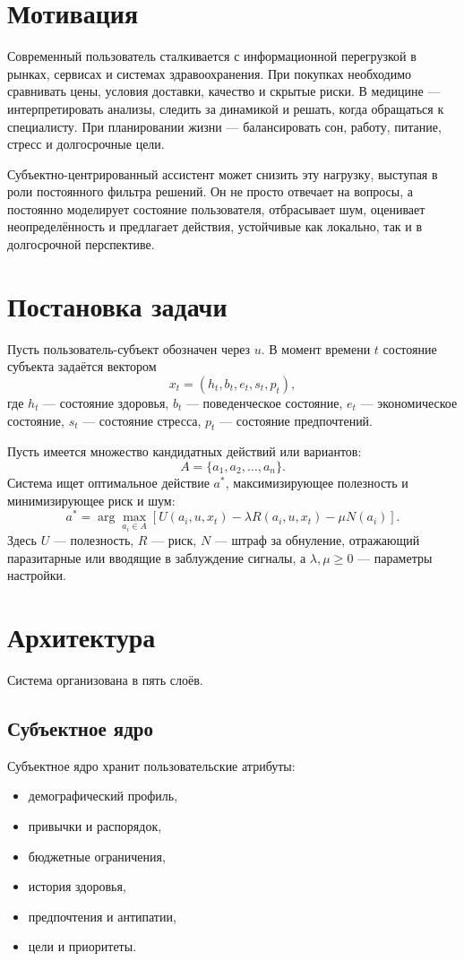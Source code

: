 \documentclass[11pt,a4paper]{article}
\begin{document}
\section{Мотивация}

Современный пользователь сталкивается с информационной перегрузкой в рынках, сервисах и системах здравоохранения. При покупках необходимо сравнивать цены, условия доставки, качество и скрытые риски. В медицине — интерпретировать анализы, следить за динамикой и решать, когда обращаться к специалисту. При планировании жизни — балансировать сон, работу, питание, стресс и долгосрочные цели.

Субъектно-центрированный ассистент может снизить эту нагрузку, выступая в роли постоянного фильтра решений. Он не просто отвечает на вопросы, а постоянно моделирует состояние пользователя, отбрасывает шум, оценивает неопределённость и предлагает действия, устойчивые как локально, так и в долгосрочной перспективе.

\section{Постановка задачи}

Пусть пользователь-субъект обозначен через $u$. В момент времени $t$ состояние субъекта задаётся вектором
\[
x_t = (h_t, b_t, e_t, s_t, p_t),
\]
где $h_t$ — состояние здоровья, $b_t$ — поведенческое состояние, $e_t$ — экономическое состояние, $s_t$ — состояние стресса, $p_t$ — состояние предпочтений.

Пусть имеется множество кандидатных действий или вариантов:
\[
A = \{a_1, a_2, \dots, a_n\}.
\]
Система ищет оптимальное действие $a^*$, максимизирующее полезность и минимизирующее риск и шум:
\[
a^* = \arg\max_{a_i \in A} \left[ U(a_i, u, x_t) - \lambda R(a_i, u, x_t) - \mu N(a_i) \right].
\]
Здесь $U$ — полезность, $R$ — риск, $N$ — штраф за обнуление, отражающий паразитарные или вводящие в заблуждение сигналы, а $\lambda, \mu \ge 0$ — параметры настройки.

\section{Архитектура}

Система организована в пять слоёв.

\subsection{Субъектное ядро}
Субъектное ядро хранит пользовательские атрибуты:
\begin{itemize}[leftmargin=1.2em]
    \item демографический профиль,
    \item привычки и распорядок,
    \item бюджетные ограничения,
    \item история здоровья,
    \item предпочтения и антипатии,
    \item цели и приоритеты.
\end{itemize}
\end{document}
